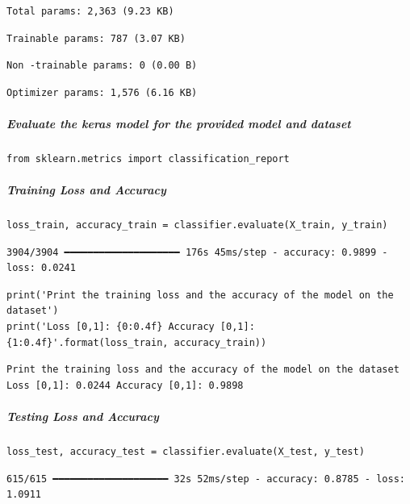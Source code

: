 \begin{verbatim}
Total params: 2,363 (9.23 KB)
\end{verbatim}

\begin{verbatim}
Trainable params: 787 (3.07 KB)
\end{verbatim}

\begin{verbatim}
Non -trainable params: 0 (0.00 B)
\end{verbatim}

\begin{verbatim}
Optimizer params: 1,576 (6.16 KB)
\end{verbatim}

\subparagraph{Evaluate the keras model for the provided model and dataset}

\begin{verbatim}
from sklearn.metrics import classification_report
\end{verbatim}

\subparagraph{Training Loss and Accuracy}

\begin{verbatim}
loss_train, accuracy_train = classifier.evaluate(X_train, y_train)
\end{verbatim}

\begin{verbatim}
3904/3904 ━━━━━━━━━━━━━━━━━━━━ 176s 45ms/step - accuracy: 0.9899 - loss: 0.0241
\end{verbatim}

\begin{verbatim}
print('Print the training loss and the accuracy of the model on the dataset')
print('Loss [0,1]: {0:0.4f} Accuracy [0,1]: {1:0.4f}'.format(loss_train, accuracy_train))
\end{verbatim}

\begin{verbatim}
Print the training loss and the accuracy of the model on the dataset
Loss [0,1]: 0.0244 Accuracy [0,1]: 0.9898
\end{verbatim}

\subparagraph{Testing Loss and Accuracy}

\begin{verbatim}
loss_test, accuracy_test = classifier.evaluate(X_test, y_test)
\end{verbatim}

\begin{verbatim}
615/615 ━━━━━━━━━━━━━━━━━━━━ 32s 52ms/step - accuracy: 0.8785 - loss: 1.0911
\end{verbatim}

